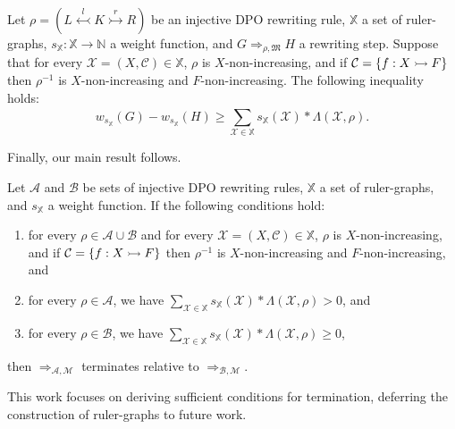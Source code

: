 \begin{lemma}
    \label{antipattern:lem:w_g_geq_w_h_leq}
    Let $\rho \mathop{=} (L \overset{l}{\leftarrowtail} K \overset{r}{\rightarrowtail} R)$ be an injective DPO rewriting rule,
    \( \mathbb{X} \) a set of ruler-graphs,
    \( s_{\mathbb{X}} \mathop{\colon} \mathbb{X} \mathop{\to} \mathbb{N} \) a weight function,
    and \( G \mathop{\Rightarrow}_{\rho,\mathfrak{M}} H \) a rewriting step. 
    Suppose that for every \( \mathcal{X}=(X,\mathcal{C}) \mathop{\in} \mathbb{X} \), 
    $\rho$ is $X$-non-increasing, and if $\mathcal{C}= \{f:X \rightarrowtail F\}$ then $\rho^{-1}$ is $X$-non-increasing and $F$-non-increasing. The following inequality holds:
     $$
        w_{s_\mathbb{X}}(G) \mathop{-} w_{s_\mathbb{X}}(H) 
        \mathop{\geq} 
        \sum_{\mathcal{X} \mathop{\in} \mathbb{X}}^{}s_\mathbb{X}(\mathcal{X}) \mathop{*} \Lambda(\mathcal{X},\rho).
    $$
\end{lemma}
Finally, our main result follows.
\begin{theorem}[Termination] 
    \label{antipattern:thm:termination_grs} 
    Let \(\mathcal{A}\) and \(\mathcal{B}\) be sets of injective DPO rewriting rules, $\mathbb{X}$ a set of ruler-graphs, and $s_\mathbb{X}$ a weight function. If the following conditions hold:
    \begin{enumerate}
        \item  for every $\rho \mathop{\in} \mathcal{A} \mathop{\cup} \mathcal{B}$ and for every \( \mathcal{X} = (X, \mathcal{C}) \mathop{\in} \mathbb{X} \), 
        $\rho$ is $X$-non-increasing, and if $\mathcal{C}= \{f:X \rightarrowtail F\}$ then $\rho^{-1}$ is $X$-non-increasing and $F$-non-increasing, and
        \item for every \(\rho \mathop{\in} \mathcal{A}\), we have
        $ \sum_{\mathcal{X} \mathop{\in} \mathbb{X}}^{}s_\mathbb{X}(\mathcal{X}) \mathop{*} 
            \Lambda(\mathcal{X},\rho) \mathop{>} 0 $, and
        \item for every \(\rho \mathop{\in} \mathcal{B}\), we have   
        $ 
            \sum_{\mathcal{X} \mathop{\in} \mathbb{X}}^{}s_\mathbb{X}(\mathcal{X}) \mathop{*} \Lambda(\mathcal{X},\rho) \mathop{\geq} 0 
        $,
    \end{enumerate}
    then \(\mathop{\Rightarrow}_{\mathcal{A},\mathcal{M}}\) terminates relative to \(\mathop{\Rightarrow}_{\mathcal{B},\mathcal{M}}\).
\end{theorem}
\begin{remark}
    This work focuses on deriving sufficient conditions for termination, deferring the construction of ruler-graphs to future work.
\end{remark} 
